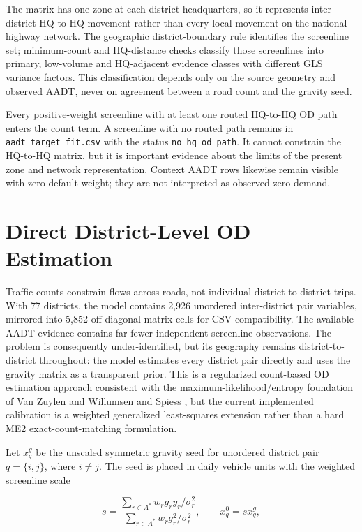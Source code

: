 \documentclass[11pt,a4paper]{article}
\begin{document}
The matrix has one zone at each district headquarters, so it represents
inter-district HQ-to-HQ movement rather than every local movement on the
national highway network. The geographic district-boundary rule identifies the
screenline set; minimum-count and HQ-distance checks classify those screenlines
into primary, low-volume and HQ-adjacent evidence classes with different GLS
variance factors. This classification depends only on the source geometry and
observed AADT, never on agreement between a road count and the gravity seed.

Every positive-weight screenline with at least one routed HQ-to-HQ OD path
enters the count term. A screenline with no routed path remains in
\texttt{aadt\_target\_fit.csv} with the status
\texttt{no\_hq\_od\_path}. It cannot constrain the HQ-to-HQ matrix, but it is
important evidence about the limits of the present zone and network
representation. Context AADT rows likewise remain visible with zero default
weight; they are not interpreted as observed zero demand.

\section{Direct District-Level OD Estimation}

Traffic counts constrain flows across roads, not individual district-to-district
trips. With 77 districts, the model contains 2,926 unordered inter-district
pair variables, mirrored into 5,852 off-diagonal matrix cells for CSV
compatibility. The available AADT evidence contains far fewer independent
screenline observations. The problem is consequently under-identified, but its
geography remains district-to-district throughout: the model estimates every
district pair directly and uses the gravity matrix as a transparent prior.
This is a regularized count-based OD estimation approach consistent with the
maximum-likelihood/entropy foundation of Van Zuylen and Willumsen
\cite{vanzuylen1980} and Spiess \cite{spiess1987}, but the current implemented
calibration is a weighted generalized least-squares extension rather than a hard
ME2 exact-count-matching formulation.

Let $x^g_q$ be the unscaled symmetric gravity seed for unordered district pair
$q=\{i,j\}$, where $i\ne j$. The seed is placed in daily vehicle units with the
weighted screenline scale

\begin{equation}
s=\frac{\sum_{r\in A^\ast}w_r g_r y_r/\sigma_r^2}
        {\sum_{r\in A^\ast}w_r g_r^2/\sigma_r^2},
\qquad x^0_q=s x^g_q,
\label{eq:district-target-scale}
\end{equation}
\end{document}

